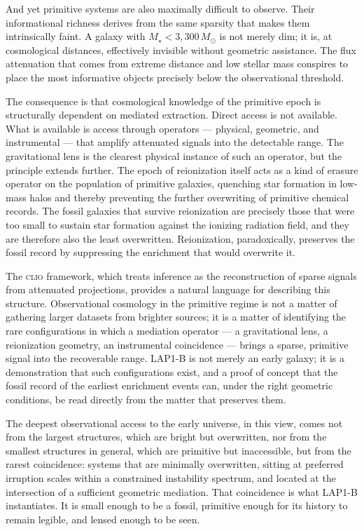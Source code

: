 \documentclass[12pt, a4paper]{article}
\newcommand{\Msun}{M_{\odot}}
\newcommand{\Mstar}{M_{\star}}
\newcommand{\CLIO}{\textsc{clio}}
\theoremstyle{definition}
\begin{document}
And yet primitive systems are also maximally difficult to observe. Their
informational richness derives from the same sparsity that makes them
intrinsically faint. A galaxy with $\Mstar < 3{,}300\,\Msun$ is not merely
dim; it is, at cosmological distances, effectively invisible without geometric
assistance. The flux attenuation that comes from extreme distance and low
stellar mass conspires to place the most informative objects precisely below
the observational threshold.

The consequence is that cosmological knowledge of the primitive epoch is
structurally dependent on mediated extraction. Direct access is not available.
What is available is access through operators --- physical, geometric, and
instrumental --- that amplify attenuated signals into the detectable range.
The gravitational lens is the clearest physical instance of such an operator,
but the principle extends further. The epoch of reionization itself acts as
a kind of erasure operator on the population of primitive galaxies, quenching
star formation in low-mass halos and thereby preventing the further overwriting
of primitive chemical records. The fossil galaxies that survive reionization
are precisely those that were too small to sustain star formation against the
ionizing radiation field, and they are therefore also the least overwritten.
Reionization, paradoxically, preserves the fossil record by suppressing the
enrichment that would overwrite it.

The \CLIO{} framework, which treats inference as the reconstruction of sparse
signals from attenuated projections, provides a natural language for describing
this structure. Observational cosmology in the primitive regime is not a matter
of gathering larger datasets from brighter sources; it is a matter of
identifying the rare configurations in which a mediation operator --- a
gravitational lens, a reionization geometry, an instrumental coincidence ---
brings a sparse, primitive signal into the recoverable range. LAP1-B is not
merely an early galaxy; it is a demonstration that such configurations exist,
and a proof of concept that the fossil record of the earliest enrichment events
can, under the right geometric conditions, be read directly from the matter
that preserves them.

The deepest observational access to the early universe, in this view, comes
not from the largest structures, which are bright but overwritten, nor from
the smallest structures in general, which are primitive but inaccessible,
but from the rarest coincidence: systems that are minimally overwritten,
sitting at preferred irruption scales within a constrained instability
spectrum, and located at the intersection of a sufficient geometric mediation.
That coincidence is what LAP1-B instantiates. It is small enough to be a
fossil, primitive enough for its history to remain legible, and lensed
enough to be seen.
\end{document}
